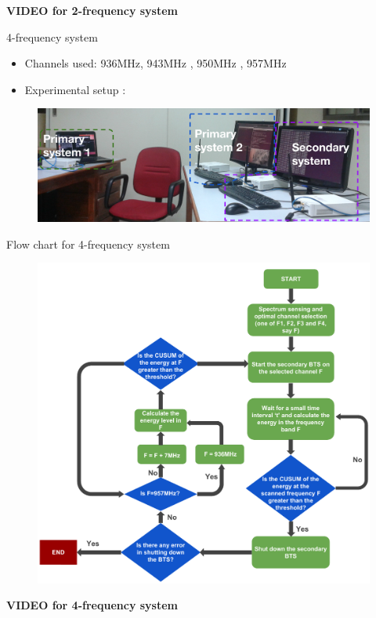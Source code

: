 \documentclass{beamer}
\begin{document}
  \begin{frame}[c]
    \begin{center}
      \LARGE \textbf{VIDEO for 2-frequency system}
    \end{center}
  \end{frame}


  
  \begin{frame}{4-frequency system}
    \begin{itemize}
      \item Channels used: 936MHz, 943MHz , 950MHz , 957MHz
      \item Experimental setup :
    \end{itemize}
    \begin{figure}
      \centering
      \includegraphics[width=0.97\linewidth]{img/freq4}
    \end{figure}
  \end{frame}
  
  \begin{frame}{Flow chart for 4-frequency system}
    \begin{figure}
      \centering
      \includegraphics[height=0.9\textheight]{img/freqSys4}
    \end{figure}
  \end{frame}

  \begin{frame}[c]
    \begin{center}
      \LARGE \textbf{VIDEO for 4-frequency system}
    \end{center}
  \end{frame}
    
\end{document}
